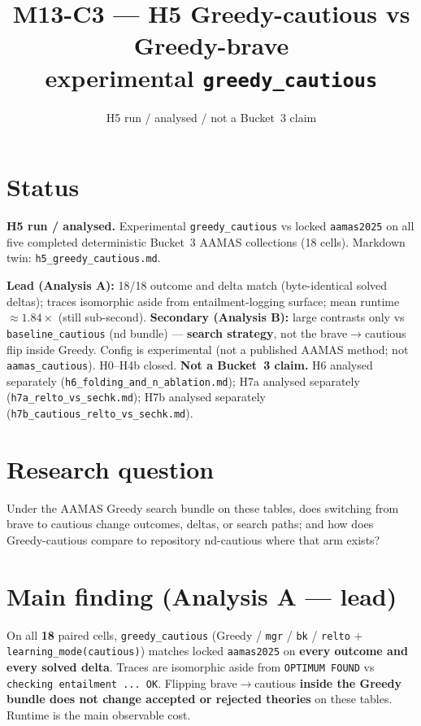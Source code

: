 \documentclass[11pt]{article}
\title{M13-C3 --- H5 Greedy-cautious vs Greedy-brave\\
experimental \texttt{greedy\_cautious}}
\author{}
\date{H5 run / analysed / not a Bucket~3 claim}
\begin{document}
\maketitle

\section{Status}

\textbf{H5 run / analysed.}
Experimental \texttt{greedy\_cautious} vs locked \texttt{aamas2025} on all five
completed deterministic Bucket~3 AAMAS collections (18 cells).
Markdown twin: \texttt{h5\_greedy\_cautious.md}.

\textbf{Lead (Analysis A):} 18/18 outcome and delta match (byte-identical
solved deltas); traces isomorphic aside from entailment-logging surface;
mean runtime $\approx 1.84\times$ (still sub-second).
\textbf{Secondary (Analysis B):} large contrasts only vs
\texttt{baseline\_cautious} (nd bundle) --- \textbf{search strategy}, not the
brave$\to$cautious flip inside Greedy.
Config is experimental (not a published AAMAS method; not
\texttt{aamas\_cautious}).
H0--H4b closed. \textbf{Not a Bucket~3 claim.}
H6 analysed separately (\texttt{h6\_folding\_and\_n\_ablation.md}); H7a
analysed separately (\texttt{h7a\_relto\_vs\_sechk.md}); H7b analysed
separately (\texttt{h7b\_cautious\_relto\_vs\_sechk.md}).

\section{Research question}

Under the AAMAS Greedy search bundle on these tables, does switching from brave
to cautious change outcomes, deltas, or search paths; and how does
Greedy-cautious compare to repository nd-cautious where that arm exists?

\section{Main finding (Analysis A --- lead)}

On all \textbf{18} paired cells, \texttt{greedy\_cautious} (Greedy /
\texttt{mgr} / \texttt{bk} / \texttt{relto} + \texttt{learning\_mode(cautious)})
matches locked \texttt{aamas2025} on \textbf{every outcome and every solved
delta}.
Traces are isomorphic aside from \texttt{OPTIMUM FOUND} vs
\texttt{checking entailment ... OK}.
Flipping brave$\to$cautious \textbf{inside the Greedy bundle does not change
accepted or rejected theories} on these tables.
Runtime is the main observable cost.
\end{document}
